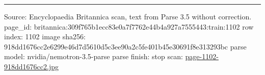 \documentclass[10pt]{article}
\begin{document}
\vfill\par\noindent\rule{\linewidth}{0.4pt}\par
{\scriptsize\color{gray}\noindent Source: Encyclopaedia Britannica scan, text from Parse 3.5 without correction. page\_id: britannica:309f765b1ecc83e0a7f7762e44b4a927a7555443:train:1102 \quad row index: 1102 \quad image sha256: 918dd1676cc2e6299e46d7d5610d5c3ee90a2c5fe401b45e30691f8e313293bc \quad parse model: nvidia/nemotron-3.5-parse \quad parse finish: stop \quad scan: \href{../scans/page-1102-918dd1676cc2.jpg}{page-1102-918dd1676cc2.jpg}\par}
\end{document}
